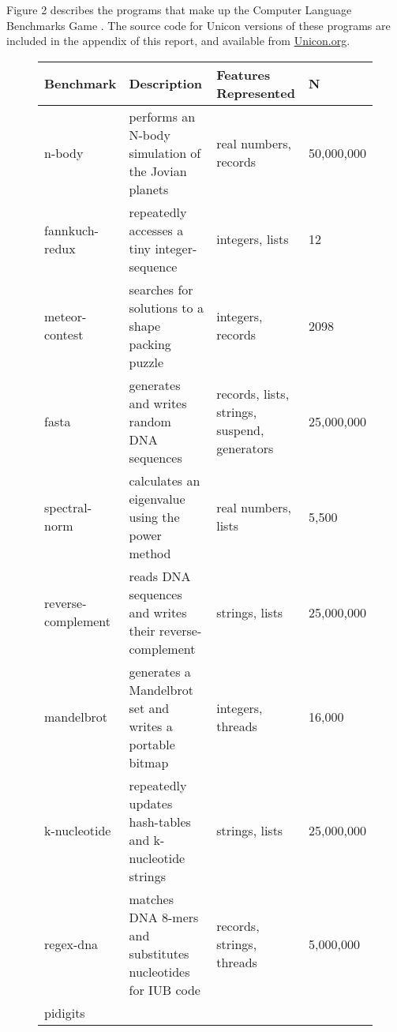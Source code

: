 \documentclass[letterpaper,12pt]{article}
\begin{document}
Figure 2 describes the programs that make up the Computer Language
Benchmarks Game \cite{shootout:2014}. The source code for Unicon versions of these programs
are included in the appendix of this report, and available from
\url{Unicon.org}.

\vspace{5mm}

\begin{figure}[h]
  \begin{center}
    {\footnotesize
      \begin{tabular}{ | p{1.6cm} | p{6.6cm} | p{3.2cm} | p{1.4cm} |}
        \hline
        Benchmark & 
        Description & 
        Features Represented &
        N
        \\ \hline
        n-body & 
        performs an N-body simulation of the Jovian planets & 
        real numbers, records &
        50,000,000
        \\ \hline
        fannkuch-redux & 
        repeatedly accesses a tiny integer-sequence & 
        integers, lists & 
        12
        \\ \hline
        meteor-contest & 
        searches for solutions to a shape packing puzzle & 
        integers, records &
        2098
        \\ \hline
        fasta & 
        generates and writes random DNA sequences & 
        records, lists, strings, suspend, generators & 
        25,000,000
        \\ \hline
        spectral-norm & 
        calculates an eigenvalue using the power method & 
        real numbers, lists & 
        5,500
        \\ \hline
        reverse-complement & 
        reads DNA sequences and writes their reverse-complement & 
        strings, lists & 
        25,000,000
        \\ \hline
        mandelbrot & 
        generates a Mandelbrot set and writes a portable bitmap & 
        integers, threads &  
        16,000
        \\ \hline
        k-nucleotide & 
        repeatedly updates hash-tables and k-nucleotide strings & 
        strings, lists &  
        25,000,000
        \\ \hline
        regex-dna & 
        matches DNA 8-mers and substitutes nucleotides for IUB code & 
        records, strings, threads &  
        5,000,000
        \\ \hline
        pidigits &

\end{tabular}}
\end{center}
\end{figure}
\end{document}
